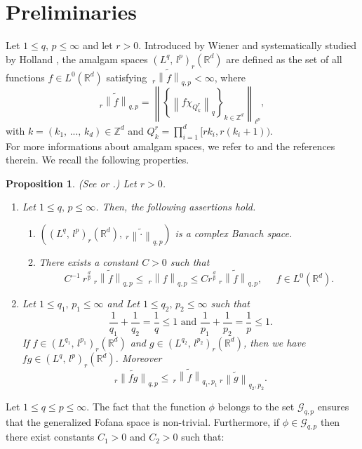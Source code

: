 \documentclass[a4paper,12pt,intlimits,oneside]{amsart}
\numberwithin{equation}{section}
\newtheorem{proposition}[theorem]{Proposition}
\numberwithin{equation}{section}
\theoremstyle{definition}
\begin{document}
\section{Preliminaries}
\label{S2}
 Let $1\leq q,\, p \leq\infty$ and let $r>0$. Introduced by Wiener \cite{W} and systematically studied by Holland \cite{FH}, the amalgam spaces $(L^{q},\, l^{p})_{r}(\mathbb{R}^{d})$ are defined as the set of all functions $f \in L^{0}(\mathbb{R}^{d})$ satisfying $ \: _{r}\widetilde{\left\|f\right\|}_{q,p}<\infty$, where 
 $$_{r}\widetilde{\left\|f\right\|}_{q,p}= \left\|\left\{  \left\|f\chi_{Q^{r}_{k}}\right\|_{q} \right\}_{k \in \mathbb{Z}^{d} }\right\|_{\ell^{p}},  $$
with $k=(k_{1},\, ...,\,k_{d})\in \mathbb{Z}^{d}$ and
 $ Q^{r}_{k} = \prod_{i=1}^{d}  [rk_{i}, r(k_{i}+1)) $.\\
For more informations about amalgam spaces, we refer to \cite{FS2} and the references therein. We recall the following properties. 
 \begin{proposition} 
 \label{prop 3} (See \cite{FH} or  \cite{FS2}.)
Let $r>0$.
\begin{enumerate} 
\item Let $1\leq q,\, p \leq\infty$. Then, the following assertions
hold.
\begin{enumerate}
\item  $((L^{q},\, l^{p})_{r}(\mathbb{R}^{d}),   \: _{r}\widetilde{\left\|\cdot  \right\|}_{q,p}) $ is a complex Banach space.
\item  There exists a constant $ C>0 $ such that
$$C^{-1}\:r^{\frac{d}{p}}\:_{r}\widetilde{\left\|f\right\|}_{q,p}\leq \: _{r}\left\|f\right\|_{q,p} \leq C r^{\frac{d}{p}}\:_{r}\widetilde{\left\|f\right\|}_{q,p},\;\;\;\;\; f \in L^{0}(\mathbb{R}^{d}).$$
\end{enumerate}
\item Let $1\leq q_1,\, p_1 \leq \infty$ and Let $1\leq q_2,\, p_2 \leq \infty$ such that
$$\frac{1}{q_1}+ \frac{1}{q_2}=\frac{1}{q} \leq 1 \text{ and }  \frac{1}{p_1}+ \frac{1}{p_2}=\frac{1}{p} \leq 1. $$
If $f \in (L^{q_1},\, l^{p_1})_{r}(\mathbb{R}^{d})$ and $g \in (L^{q_2},\, l^{p_2})_{r}(\mathbb{R}^{d})$, then we have $fg \in (L^{q},\, l^{p})_{r}(\mathbb{R}^{d})$. Moreover
$$ _{r}\widetilde{\left\|fg\right\|}_{q,p}\leq \,  _{r}\widetilde{\left\|f\right\|}_{q_1,p_1}\, _{r}\widetilde{\left\|g\right\|}_{q_2,p_2}.$$
\end{enumerate}
 \end{proposition} 
Let $1\leq q \leq p\leq \infty$. The fact that the function $\phi$ belongs to the set $\mathcal{G}_{q,p}$ ensures that the generalized Fofana space  is non-trivial. Furthermore, if $\phi \in \mathcal{G}_{q,p}$ then there exist constants $C_1>0$ and $C_2>0$ such that:
\end{document}
